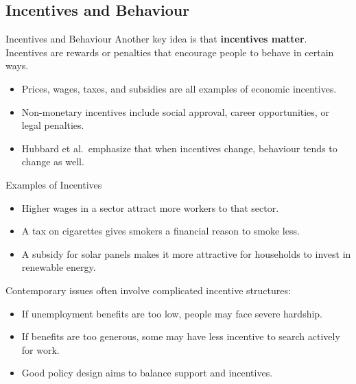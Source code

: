 \documentclass[aspectratio=169]{beamer}
\begin{document}
\subsection{Incentives and Behaviour}

\begin{frame}{Incentives and Behaviour}
  \transfade
  Another key idea is that \textbf{incentives matter}. Incentives are rewards or penalties that
  encourage people to behave in certain ways.

  \begin{itemize}
    \item Prices, wages, taxes, and subsidies are all examples of economic incentives.
    \item Non-monetary incentives include social approval, career opportunities, or legal penalties.
    \item Hubbard et al.\ emphasize that when incentives change, behaviour tends to change as well.
  \end{itemize}
\end{frame}

\begin{frame}{Examples of Incentives}
  \transfade
  \begin{itemize}
    \item Higher wages in a sector attract more workers to that sector.
    \item A tax on cigarettes gives smokers a financial reason to smoke less.
    \item A subsidy for solar panels makes it more attractive for households to invest in renewable
    energy.
  \end{itemize}

  \vspace{0.3cm}
  Contemporary issues often involve complicated incentive structures:
  \begin{itemize}
    \item If unemployment benefits are too low, people may face severe hardship.
    \item If benefits are too generous, some may have less incentive to search actively for work.
    \item Good policy design aims to balance support and incentives.
  \end{itemize}
\end{frame}

\end{document}

